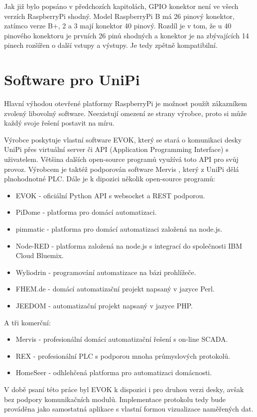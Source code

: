 Jak již bylo popsáno v předchozích kapitolách, GPIO konektor není ve všech verzích RaspberryPi shodný. Model RaspberryPi B má 26 pinový konektor, zatímco verze B+, 2 a 3 mají konektor 40 pinový. Rozdíl je v tom, že u 40 pinového konektoru je prvních 26 pinů shodných a konektor je na zbývajících 14 pinech rozšířen o další vstupy a výstupy. Je tedy zpětně kompatibilní.




\section{Software pro UniPi}

Hlavní výhodou otevřené platformy RaspberryPi je možnost použít zákazníkem zvolený libovolný software. Neexistují omezení ze strany výrobce, proto si může každý svoje řešení postavit na míru.

Výrobce poskytuje vlastní software EVOK, který se stará o komunikaci desky UniPi přes virtuální server či API (Application Programming Interface) s uživatelem. Většina dalších open-source programů využívá toto API pro svůj provoz. Výrobcem je taktéž podporován software Mervis \cite{MervisWeb}, který z UniPi dělá plnohodnotné PLC. Dále je k dipozici několik open-source programů:
\begin{itemize}
\item EVOK - oficiální Python API s websocket a REST podporou.
\item PiDome - platforma pro domácí automatizaci.
\item pimmatic - platforma pro domácí automatizaci založená na node.js.
\item Node-RED - platforma založená na node.js s integrací do společnosti IBM Cloud Bluemix.
\item Wyliodrin - programování automatizace na bázi prohlížeče.
\item FHEM.de - domácí automatizační projekt napsaný v jazyce Perl.
\item JEEDOM - automatizační projekt napsaný v jazyce PHP.
\end{itemize}
A tři komerční:
\begin{itemize}
\item Mervis - profesionální domácí automatizační řešení s on-line SCADA.
\item REX - profesionální PLC s podporou mnoha průmyslových protokolů.
\item HomeSeer - odhlehčená platforma pro automatizaci domácnosti.
\end{itemize}

V době psaní této práce byl EVOK k dispozici i pro druhou verzi desky, avšak bez podpory komunikačních modulů. Implementace protokolu tedy bude prováděna jako samostatná aplikace s vlastní formou vizualizace naměřených dat.





 